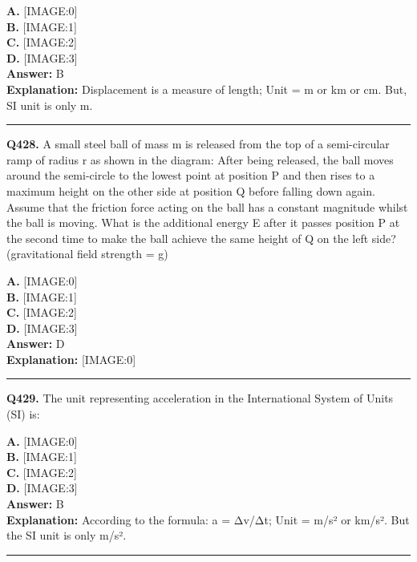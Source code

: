 \documentclass[12pt]{article}
\begin{document}
\textbf{A.} [IMAGE:0] \\
\textbf{B.} [IMAGE:1] \\
\textbf{C.} [IMAGE:2] \\
\textbf{D.} [IMAGE:3] \\

\textbf{Answer:} B \\
\textbf{Explanation:} Displacement is a measure of length; Unit = m or km or cm.
But, SI unit is only m.

\hrule
\vspace{1em}


\noindent
\textbf{Q428.} A small steel ball of mass m is released from the top of a semi-circular ramp of radius r as shown in the diagram:
After being released, the ball moves around the semi-circle to the lowest point at position P and then rises to a maximum height on the other side at position Q before falling down again. Assume that the friction force acting on the ball has a constant magnitude whilst the ball is moving. What is the additional energy E after it passes position P at the second time to make the ball achieve the same height of Q on the left side? (gravitational field strength = g)



\textbf{A.} [IMAGE:0] \\
\textbf{B.} [IMAGE:1] \\
\textbf{C.} [IMAGE:2] \\
\textbf{D.} [IMAGE:3] \\

\textbf{Answer:} D \\
\textbf{Explanation:} [IMAGE:0]

\hrule
\vspace{1em}


\noindent
\textbf{Q429.} The unit representing acceleration in the International System of Units (SI) is:



\textbf{A.} [IMAGE:0] \\
\textbf{B.} [IMAGE:1] \\
\textbf{C.} [IMAGE:2] \\
\textbf{D.} [IMAGE:3] \\

\textbf{Answer:} B \\
\textbf{Explanation:} According to the formula: a = Δv/Δt; Unit = m/s² or km/s².
But the SI unit is only m/s².

\hrule
\vspace{1em}
\end{document}
